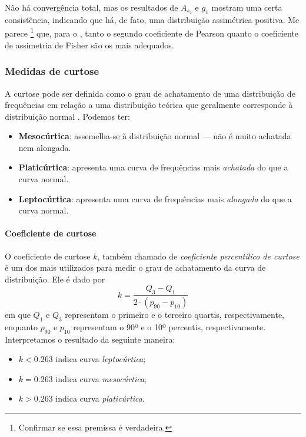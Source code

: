 Não há convergência total, mas os resultados de $A_{s_2}$ e $g_1$ mostram uma
certa consistência, indicando que há, de fato, uma distribuição assimétrica
positiva. Me parece \footnote{Confirmar se essa premissa é verdadeira.}
que, para o , tanto o segundo coeficiente de Pearson
quanto o coeficiente de assimetria de Fisher são os mais adequados.

\subsubsection{Medidas de curtose}

A curtose pode ser definida como o grau de achatamento de uma distribuição de
frequências em relação a uma distribuição teórica que geralmente corresponde à
distribuição normal \parencite[p.~166]{favero}. Podemos ter:
\begin{itemize}
    \item \textbf{Mesocúrtica}: assemelha-se à distribuição normal --- não é
    muito achatada nem alongada.
    \item \textbf{Platicúrtica}: apresenta uma curva de frequências mais
    \emph{achatada} do que a curva normal.
    \item \textbf{Leptocúrtica}: apresenta uma curva de frequências mais
    \emph{alongada} do que a curva normal.
\end{itemize}

\paragraph{Coeficiente de curtose}
O coeficiente de curtose $k$, também chamado de \emph{coeficiente
percentílico de curtose} é um dos mais utilizados para medir o grau de
achatamento da curva de distribuição. Ele é dado por
\begin{equation}
    k = \frac{Q_3-Q_1}{2 \cdot (p_{90}-p_{10})}
    \label{eq:coef-curtose}
\end{equation}
em que $Q_1$ e $Q_3$ representam o primeiro e o terceiro quartis,
respectivamente, enquanto $p_{90}$ e $p_{10}$ representam o 90º e o 10º
percentis, respectivamente. Interpretamos o resultado da seguinte maneira:
\begin{itemize}
    \item $k<0.263$ indica curva \emph{leptocúrtica};
    \item $k=0.263$ indica curva \emph{mesocúrtica};
    \item $k>0.263$ indica curva \emph{platicúrtica}.
\end{itemize}

